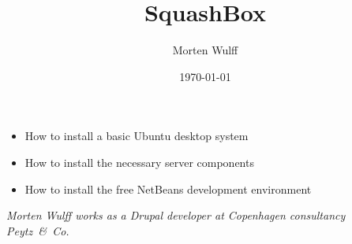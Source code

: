 \documentclass[final,ebook,17pt,oneside,extrafontsizes]{memoir}
\title{SquashBox}
\author{Morten Wulff}
\date{\today}
\begin{document}
\pagecolor{peytzorange}
\color{white}


\vspace*{0em}
\begin{flushright}
\sffamily\scshape\bfseries\Huge\thetitle\par
\end{flushright}
\vspace*{\fill}
\begin{flushright}
\end{flushright}
\thispagestyle{empty}
\clearpage



\footnotesize

\begin{itemize}
\item How to install a basic Ubuntu desktop system
\item How to install the necessary server components
\item How to install the free NetBeans development environment
\end{itemize}

\noindent
\emph{Morten Wulff works as a Drupal developer at Copenhagen consultancy Peytz~\&~Co.}

\vspace*{\fill}
\hspace*{\fill}\EANisbn
\thispagestyle{empty}
\end{document}
